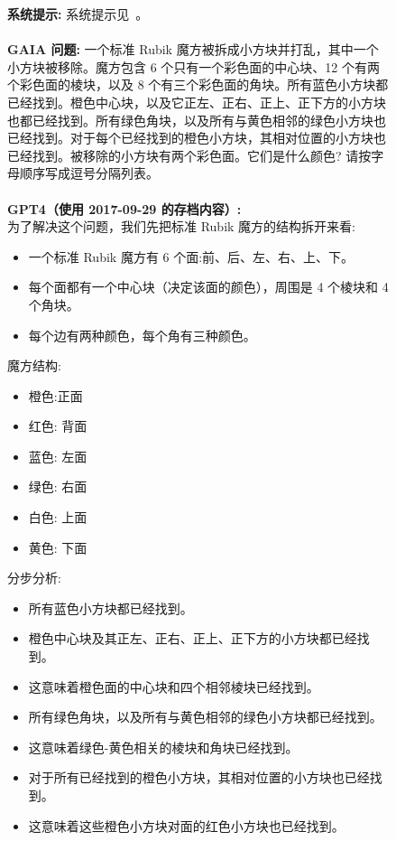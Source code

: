 \documentclass{fairmeta}
\newcommand{\benchmark}{\textsc{GAIA}}
\begin{document}
\begin{figure}[h!]
 \small
 \centering
 \begin{tcolorbox}[colframe=RoyalBlue, colback=white]
 \textbf{系统提示:} 系统提示见~。
 \\
 \\
 \textbf{\benchmark{} 问题:} 一个标准 Rubik 魔方被拆成小方块并打乱，其中一个小方块被移除。魔方包含 6 个只有一个彩色面的中心块、12 个有两个彩色面的棱块，以及 8 个有三个彩色面的角块。所有蓝色小方块都已经找到。橙色中心块，以及它正左、正右、正上、正下方的小方块也都已经找到。所有绿色角块，以及所有与黄色相邻的绿色小方块也已经找到。对于每个已经找到的橙色小方块，其相对位置的小方块也已经找到。被移除的小方块有两个彩色面。它们是什么颜色? 请按字母顺序写成逗号分隔列表。
 \\
 \\
 \textbf{GPT4（使用 2017-09-29 的存档内容）:} 
 \\
 为了解决这个问题，我们先把标准 Rubik 魔方的结构拆开来看:
\begin{itemize}
 \item 一个标准 Rubik 魔方有 6 个面:前、后、左、右、上、下。
 \item 每个面都有一个中心块（决定该面的颜色），周围是 4 个棱块和 4 个角块。
 \item 每个边有两种颜色，每个角有三种颜色。
\end{itemize}

魔方结构:
\begin{itemize}
 \item 橙色:正面
 \item 红色: 背面
 \item 蓝色: 左面
 \item 绿色: 右面
 \item 白色: 上面
 \item 黄色: 下面
\end{itemize}

分步分析:
\begin{itemize}
 \item 所有蓝色小方块都已经找到。
 \item 橙色中心块及其正左、正右、正上、正下方的小方块都已经找到。
 \item 这意味着橙色面的中心块和四个相邻棱块已经找到。
 \item 所有绿色角块，以及所有与黄色相邻的绿色小方块都已经找到。
 \item 这意味着绿色-黄色相关的棱块和角块已经找到。
 \item 对于所有已经找到的橙色小方块，其相对位置的小方块也已经找到。
 \item 这意味着这些橙色小方块对面的红色小方块也已经找到。
\end{itemize}


\end{tcolorbox}
\end{figure}
\end{document}
